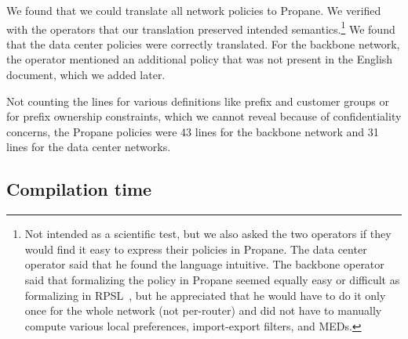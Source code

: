 \documentclass{sig-alternate-10pt}
\newcommand{\sysname}{{\small \sf Propane}\xspace}
\begin{document}
We found that we could translate all network policies to \sysname. We verified with the operators that our translation preserved intended semantics.\footnote{Not intended as a scientific test, but we also asked the two operators if they would find it easy to express their policies in \sysname. The data center operator said that he found the language intuitive. The backbone operator said that formalizing the policy in \sysname seemed equally easy or difficult as formalizing in RPSL~\cite{RFC2622}, but he appreciated that he would have to do it only once for the whole network (not per-router) and did not have to manually compute various local preferences, import-export filters, and MEDs.} We found that the data center policies were correctly translated. For the backbone network, the operator mentioned an additional policy that was not present in the English document, which we added later.

Not counting the lines for various definitions like prefix and customer groups or for prefix ownership constraints, which we cannot reveal because of confidentiality concerns, the \sysname policies were 43 lines for the backbone network and 31 lines for the data center networks.


\subsection{Compilation time}



\end{document}
